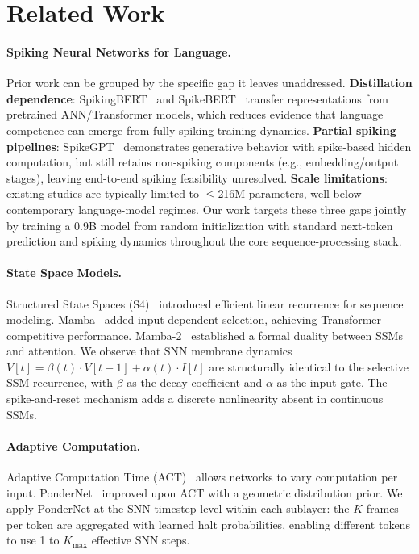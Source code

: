 \documentclass{article}
\begin{document}
\section{Related Work}
\label{sec:related}

\paragraph{Spiking Neural Networks for Language.}
Prior work can be grouped by the specific gap it leaves unaddressed. \textbf{Distillation dependence}: SpikingBERT~\citep{bal2024spikingbert} and SpikeBERT~\citep{lv2023spikebert} transfer representations from pretrained ANN/Transformer models, which reduces evidence that language competence can emerge from fully spiking training dynamics. \textbf{Partial spiking pipelines}: SpikeGPT~\citep{zhu2024spikegpt} demonstrates generative behavior with spike-based hidden computation, but still retains non-spiking components (e.g., embedding/output stages), leaving end-to-end spiking feasibility unresolved. \textbf{Scale limitations}: existing studies are typically limited to $\leq$216M parameters, well below contemporary language-model regimes. Our work targets these three gaps jointly by training a 0.9B model from random initialization with standard next-token prediction and spiking dynamics throughout the core sequence-processing stack.

\paragraph{State Space Models.}
Structured State Spaces (S4)~\citep{gu2022efficiently} introduced efficient linear recurrence for sequence modeling.
Mamba~\citep{gu2024mamba} added input-dependent selection, achieving Transformer-competitive performance.
Mamba-2~\citep{dao2024transformers} established a formal duality between SSMs and attention.
We observe that SNN membrane dynamics $V[t] = \beta(t) \cdot V[t-1] + \alpha(t) \cdot I[t]$ are structurally identical to the selective SSM recurrence, with $\beta$ as the decay coefficient and $\alpha$ as the input gate.
The spike-and-reset mechanism adds a discrete nonlinearity absent in continuous SSMs.

\paragraph{Adaptive Computation.}
Adaptive Computation Time (ACT)~\citep{graves2016adaptive} allows networks to vary computation per input.
PonderNet~\citep{banino2021pondernet} improved upon ACT with a geometric distribution prior.
We apply PonderNet at the SNN timestep level within each sublayer: the $K$ frames per token are aggregated with learned halt probabilities, enabling different tokens to use 1 to $K_{\max}$ effective SNN steps.
\end{document}
